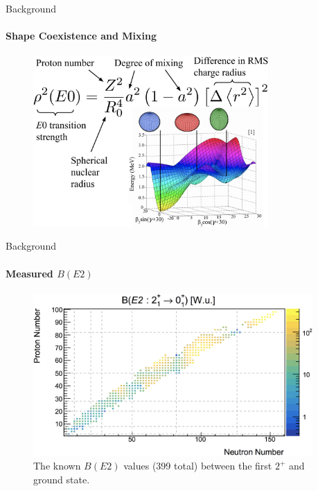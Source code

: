 \documentclass{beamer}
\begin{document}


\begin{frame}{Background}
\framesubtitle{Shape Coexistence and Mixing}
\begin{figure}[!hht]
  \centering
  \includegraphics[width=0.8\textwidth, keepaspectratio]{ShapeCoexistenceAndMixing.png}
  \label{geopE0}
\end{figure}
\end{frame}



\begin{frame}{Background}
\framesubtitle{Measured $B(E2)$}
\begin{figure}[!hht]
  \centering
  \includegraphics[width=0.95\textwidth, keepaspectratio]{EvittsE2.png}
  \caption{The known $B(E2)$ values (399 total) between the first $2^+$ and ground state\footnotemark[1].}
  \label{comparisonE2}
\end{figure}
\end{frame}
\end{document}
